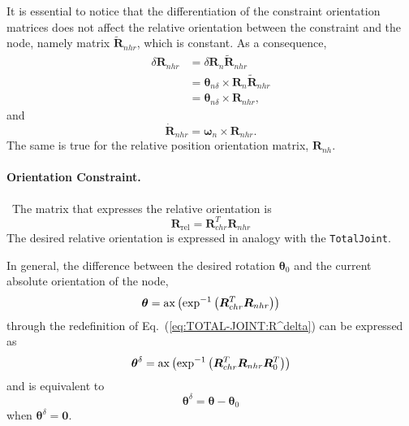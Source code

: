 \documentclass[10pt,dvips,fleqn,subeqn]{report}
\newcommand{\T}[1]{\bm{#1}}
\begin{document}
It is essential to notice that the differentiation of the constraint
orientation matrices does not affect the relative orientation between
the constraint and the node, namely matrix $\tilde{\T{R}}_{nhr}$,
which is constant.
As a consequence,
\begin{align}
	\delta\T{R}_{nhr}
		&= \delta\T{R}_n \tilde{\T{R}}_{nhr} \nonumber \\
		&= \T{\theta}_{n\delta} \times \T{R}_n \tilde{\T{R}}_{nhr}
		\nonumber \\
		&= \T{\theta}_{n\delta}\times \T{R}_{nhr} ,
\end{align}
and
\begin{equation}
	\dot{\T{R}}_{nhr} = \T{\omega}_n \times \T{R}_{nhr} .
\end{equation}
The same is true for the relative position orientation matrix,
$\T{R}_{nh}$.


\paragraph{Orientation Constraint.} \
The matrix that expresses the relative orientation is
\begin{equation}
	\T{R}_{\mathrm{rel}} = \T{R}_{chr}^T \T{R}_{nhr}
\end{equation}
The desired relative orientation is expressed in analogy 
with the \texttt{TotalJoint}.

In general, the difference between the desired rotation
$\T{\theta}_0$ and the current absolute orientation of the node,
\begin{equation}
	\T{\theta} = \llk{ax}\plbr{\exp^{-1}\plbr{
		\T{R}_{chr}^T \T{R}_{nhr}
	}}
\end{equation}
through the redefinition of Eq.~(\ref{eq:TOTAL-JOINT:R^delta}) 
can be expressed as
\begin{equation}
	\T{\theta}^{\delta} = \llk{ax}\plbr{\exp^{-1}\plbr{
		\T{R}_{chr}^T \T{R}_{nhr} \T{R}_0^T
	}}
	\label{eq:TOTAL-PIN-JOINT:thetadelta}
\end{equation}
and is equivalent to
\begin{equation}
	\T{\theta}^{\delta} = \T{\theta} - \T{\theta}_0
\end{equation}
when $\T{\theta}^{\delta}=\T{0}$.
\end{document}
